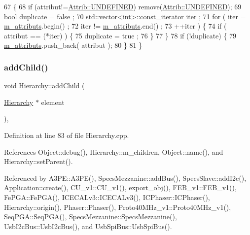 \begin{DoxyCode}
67                             \{
68     \textcolor{keywordflow}{if} (attribut!=\hyperlink{classAttrib_a69e171d7cc6417835a5a306d3c764235a3a8da2ab97dda18aebab196fe4100531}{Attrib::UNDEFINED}) \textcolor{keyword}{remove}(\hyperlink{classAttrib_a69e171d7cc6417835a5a306d3c764235a3a8da2ab97dda18aebab196fe4100531}{Attrib::UNDEFINED});
69     \textcolor{keywordtype}{bool} duplicate = false ;
70     std::vector<int>::const\_iterator iter ;
71     \textcolor{keywordflow}{for} ( iter  = \hyperlink{classAttrib_ac4bd58a0cc6b38a3b711d609a3d3aacc}{m\_attributs}.begin() ;
72           iter != \hyperlink{classAttrib_ac4bd58a0cc6b38a3b711d609a3d3aacc}{m\_attributs}.end()   ;
73           ++iter ) \{
74       \textcolor{keywordflow}{if} ( attribut == (*iter) ) \{
75         duplicate = true ;
76       \}
77     \}
78     \textcolor{keywordflow}{if} (!duplicate) \{
79       \hyperlink{classAttrib_ac4bd58a0cc6b38a3b711d609a3d3aacc}{m\_attributs}.push\_back( attribut );
80     \}
81   \}
\end{DoxyCode}
\mbox{\label{classHierarchy_ad677774ff38fcb257c04a3a10d471fac}} 
\subsubsection{\texorpdfstring{add\+Child()}{addChild()}}
{\footnotesize\ttfamily void Hierarchy\+::add\+Child (\begin{DoxyParamCaption}\item[{\hyperlink{classHierarchy}{Hierarchy} $\ast$}]{element }\end{DoxyParamCaption})\hspace{0.3cm}{\ttfamily [virtual]}, {\ttfamily [inherited]}}



Definition at line 83 of file Hierarchy.\+cpp.



References Object\+::debug(), Hierarchy\+::m\+\_\+children, Object\+::name(), and Hierarchy\+::set\+Parent().



Referenced by A3\+P\+E\+::\+A3\+P\+E(), Specs\+Mezzanine\+::add\+Bus(), Specs\+Slave\+::add\+I2c(), Application\+::create(), C\+U\+\_\+v1\+::\+C\+U\+\_\+v1(), export\+\_\+obj(), F\+E\+B\+\_\+v1\+::\+F\+E\+B\+\_\+v1(), Fe\+P\+G\+A\+::\+Fe\+P\+G\+A(), I\+C\+E\+C\+A\+Lv3\+::\+I\+C\+E\+C\+A\+Lv3(), I\+C\+Phaser\+::\+I\+C\+Phaser(), Hierarchy\+::origin(), Phaser\+::\+Phaser(), Proto40\+M\+Hz\+\_\+v1\+::\+Proto40\+M\+Hz\+\_\+v1(), Seq\+P\+G\+A\+::\+Seq\+P\+G\+A(), Specs\+Mezzanine\+::\+Specs\+Mezzanine(), Usb\+I2c\+Bus\+::\+Usb\+I2c\+Bus(), and Usb\+Spi\+Bus\+::\+Usb\+Spi\+Bus().


